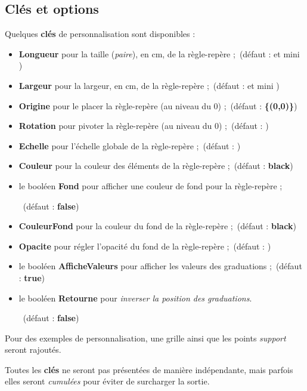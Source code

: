 \documentclass[french,a4paper,11pt]{article}
\newcommand\Cle[1]{{\bfseries\sffamily\textlangle #1\textrangle}}
\begin{document}
\subsection{Clés et options}
%
\begin{tipblock}
Quelques \Cle{clés} de personnalisation sont disponibles :

\begin{itemize}
	\item \Cle{Longueur} pour la taille (\textit{paire}), en cm, de la règle-repère ;\hfill~(défaut : \Cle{12} et mini \Cle{4})
	\item \Cle{Largeur} pour la largeur, en cm, de la règle-repère ;\hfill~(défaut : \Cle{4} et mini \Cle{4})
	\item \Cle{Origine} pour le placer la règle-repère (au niveau du $0$) ;\hfill~(défaut : \Cle{\{(0,0)\}})
	\item \Cle{Rotation} pour pivoter la règle-repère (au niveau du $0$) ;\hfill~(défaut : \Cle{0})
	\item \Cle{Echelle} pour l'échelle globale de la règle-repère ;\hfill~(défaut : \Cle{1})
	\item \Cle{Couleur} pour la couleur des éléments de la règle-repère ;\hfill~(défaut : \Cle{black})
	\item le booléen \Cle{Fond} pour afficher une couleur de fond pour la règle-repère ;
	
	\hfill~(défaut : \Cle{false})
	\item \Cle{CouleurFond} pour la couleur du fond de la règle-repère ;\hfill~(défaut : \Cle{black})
	\item \Cle{Opacite} pour régler l'opacité du fond de la règle-repère ;\hfill~(défaut : \Cle{0.5})
	\item le booléen \Cle{AfficheValeurs} pour afficher les valeurs des graduations ;\hfill~(défaut : \Cle{true})
	\item le booléen \Cle{Retourne} pour \textit{inverser la position des graduations}.
	
	\hfill~(défaut : \Cle{false})
\end{itemize}
\vspace*{-\baselineskip}\leavevmode
\end{tipblock}

\begin{noteblock}
Pour des exemples de personnalisation, une grille ainsi que les points \textit{support} seront rajoutés.

\smallskip

Toutes les \Cle{clés} ne seront pas présentées de manière indépendante, mais parfois elles seront \textit{cumulées} pour éviter de surcharger la sortie.
\end{noteblock}
\end{document}
